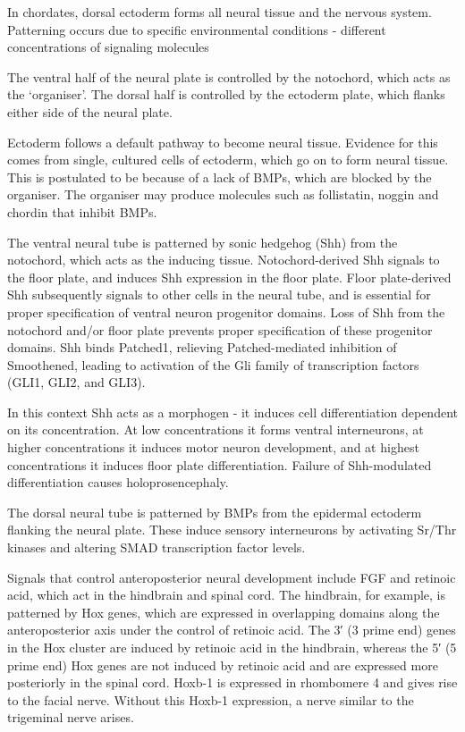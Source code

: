 \documentclass[]{book}
\begin{document}
In chordates, dorsal ectoderm forms all neural tissue and the nervous system. Patterning occurs due to specific environmental conditions - different concentrations of signaling molecules

The ventral half of the neural plate is controlled by the notochord, which acts as the `organiser'. The dorsal half is controlled by the ectoderm plate, which flanks either side of the neural plate.

Ectoderm follows a default pathway to become neural tissue. Evidence for this comes from single, cultured cells of ectoderm, which go on to form neural tissue. This is postulated to be because of a lack of BMPs, which are blocked by the organiser. The organiser may produce molecules such as follistatin, noggin and chordin that inhibit BMPs.

The ventral neural tube is patterned by sonic hedgehog (Shh) from the notochord, which acts as the inducing tissue. Notochord-derived Shh signals to the floor plate, and induces Shh expression in the floor plate. Floor plate-derived Shh subsequently signals to other cells in the neural tube, and is essential for proper specification of ventral neuron progenitor domains. Loss of Shh from the notochord and/or floor plate prevents proper specification of these progenitor domains. Shh binds Patched1, relieving Patched-mediated inhibition of Smoothened, leading to activation of the Gli family of transcription factors (GLI1, GLI2, and GLI3).

In this context Shh acts as a morphogen - it induces cell differentiation dependent on its concentration. At low concentrations it forms ventral interneurons, at higher concentrations it induces motor neuron development, and at highest concentrations it induces floor plate differentiation. Failure of Shh-modulated differentiation causes holoprosencephaly.

The dorsal neural tube is patterned by BMPs from the epidermal ectoderm flanking the neural plate. These induce sensory interneurons by activating Sr/Thr kinases and altering SMAD transcription factor levels.

Signals that control anteroposterior neural development include FGF and retinoic acid, which act in the hindbrain and spinal cord. The hindbrain, for example, is patterned by Hox genes, which are expressed in overlapping domains along the anteroposterior axis under the control of retinoic acid. The 3′ (3 prime end) genes in the Hox cluster are induced by retinoic acid in the hindbrain, whereas the 5′ (5 prime end) Hox genes are not induced by retinoic acid and are expressed more posteriorly in the spinal cord. Hoxb-1 is expressed in rhombomere 4 and gives rise to the facial nerve. Without this Hoxb-1 expression, a nerve similar to the trigeminal nerve arises.
\end{document}
